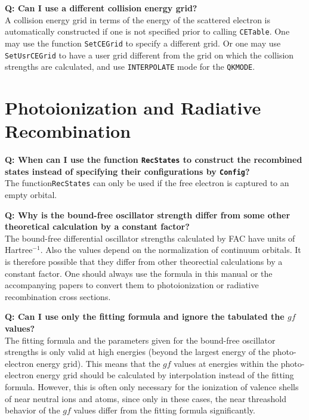 \documentclass[twoside,letterpaper]{refrep}
\newcommand{\key}[1]{\texttt{#1}}
\newcounter{faq}[section]
\newcommand{\faq}[2]{\stepcounter{faq}
	\begin{minipage}{\textwidth}
	\textbf{Q\arabic{faq}: #1?}\\#2
	\end{minipage}}
\begin{document}
\faq{Can I use a different collision energy grid}{
A collision energy grid in terms of the energy of the scattered electron is
automatically constructed if one is not specified prior to calling
\key{CETable}. One may use the function \key{SetCEGrid} to specify a different
grid. Or one may use \key{SetUsrCEGrid} to have a user grid different from the
grid on which the collision strengths are calculated, and use
\key{INTERPOLATE} mode for the \key{QKMODE}.}

\section{Photoionization and Radiative Recombination}
\faq{When can I use the function \key{RecStates} to construct the
recombined states instead of specifying their configurations by \key{Config}}{
The function\key{RecStates} can only be used if the free electron is captured
to an empty orbital.}

\faq{Why is the bound-free oscillator strength differ from some other
theoretical calculation by a constant factor}{
The bound-free differential oscillator strengths calculated by FAC have units
of Hartree$^{-1}$. Also the values depend on the normalization of continuum
orbitals. It is therefore possible that they differ from other theorectial
calculations by a constant factor. One should always use the formula in this
manual or the accompanying papers to convert them to photoionization or
radiative recombination cross sections.}

\faq{Can I use only the fitting formula and ignore the tabulated the $gf$
values}{
The fitting formula and the parameters given for the bound-free oscillator
strengths is only valid at high energies (beyond the largest energy of the
photo-electron energy grid). This means that the $gf$ values at energies
within the photo-electron energy grid should be calculated by interpolation
instead of the fitting formula. However, this is often only necessary for the
ionization of valence shells of near neutral ions and atoms, since only in
these cases, the near threashold behavior of the $gf$ values differ from the
fitting formula significantly.}
\end{document}

